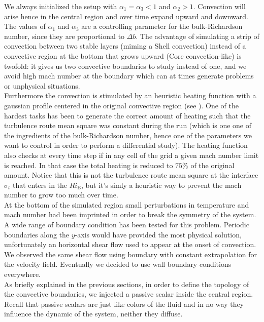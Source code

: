 \documentclass[11pt]{article}
\numberwithin{equation}{section}
\begin{document}
We always initialized the setup with $\alpha_{1} = \alpha_{3}<1$ and $\alpha_{2}>1$. Convection will arise hence in the central region and over time expand upward and downward. The values of $\alpha_{1}$ and $\alpha_{3}$ are a controlling parameter for the bulk-Richardson number, since they are proportional to $\Delta b$. The advantage of simulating a strip of convection between two stable layers (miming a Shell convection) instead of a convective region at the bottom that grows upward (Core convection-like) is twofold: it gives us two convective boundaries to study instead of one, and we avoid high mach number at the boundary which can at times generate problems or unphysical situations. \\
Furthermore the convection is stimulated by an heuristic heating function with a gaussian profile centered in the original convective region (see \label{fig:tempprofile}). One of the hardest tasks has been to generate the correct amount of heating such that the turbulence route mean square was constant during the run (which is one one of the ingredients of the bulk-Richardson number, hence one of the parameters we want to control in order to perform a differential study). The heating function also checks at every time step if in any cell of the grid a given mach number limit is reached. In that case the total heating is reduced to $75 \%$ of the original amount. Notice that this is not the turbulence route mean square at the interface $\sigma_t$ that enters in the $Ri_{\mathrm{B}}$, but it's simly a heuristic way to prevent the mach number to grow too much over time. \\
At the bottom of the simulated region small perturbations in temperature and mach number had been imprinted in order to break the symmetry of the system.\\
A wide range of boundary condition has been tested for this problem. Periodic boundaries along the $y$-axis would have provided the most physical solution, unfortunately an horizontal shear flow used to appear at the onset of convection. We observed the same shear flow using boundary with constant extrapolation for the velocity field. Eventually we decided to use wall boundary conditions everywhere. \\
As briefly explained in the previous sections, in order to define the topology of the convective boundaries, we injected a passive scalar inside the central region. Recall that passive scalars are just like colors of the fluid and in no way they influence the dynamic of the system, neither they diffuse.\\
\end{document}
